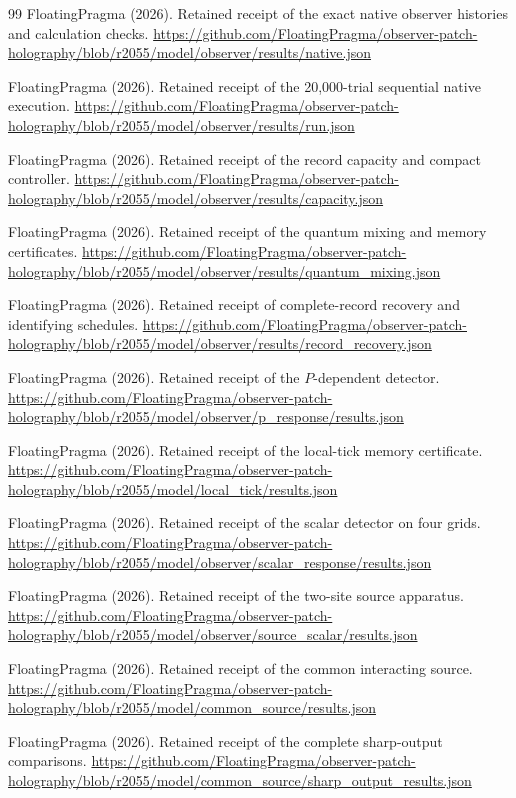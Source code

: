 \documentclass[11pt]{article}
\theoremstyle{definition}
\theoremstyle{remark}
\theoremstyle{plain}
\begin{document}
{\begin{thebibliography}{99}
FloatingPragma (2026). Retained receipt of the exact native observer histories
and calculation checks.
\url{https://github.com/FloatingPragma/observer-patch-holography/blob/r2055/model/observer/results/native.json}

FloatingPragma (2026). Retained receipt of the 20,000-trial sequential native
execution.
\url{https://github.com/FloatingPragma/observer-patch-holography/blob/r2055/model/observer/results/run.json}

FloatingPragma (2026). Retained receipt of the record capacity and compact
controller.
\url{https://github.com/FloatingPragma/observer-patch-holography/blob/r2055/model/observer/results/capacity.json}

FloatingPragma (2026). Retained receipt of the quantum mixing and memory
certificates.
\url{https://github.com/FloatingPragma/observer-patch-holography/blob/r2055/model/observer/results/quantum_mixing.json}

FloatingPragma (2026). Retained receipt of complete-record recovery and
identifying schedules.
\url{https://github.com/FloatingPragma/observer-patch-holography/blob/r2055/model/observer/results/record_recovery.json}

FloatingPragma (2026). Retained receipt of the $P$-dependent detector.
\url{https://github.com/FloatingPragma/observer-patch-holography/blob/r2055/model/observer/p_response/results.json}

FloatingPragma (2026). Retained receipt of the local-tick memory certificate.
\url{https://github.com/FloatingPragma/observer-patch-holography/blob/r2055/model/local_tick/results.json}

FloatingPragma (2026). Retained receipt of the scalar detector on four grids.
\url{https://github.com/FloatingPragma/observer-patch-holography/blob/r2055/model/observer/scalar_response/results.json}

FloatingPragma (2026). Retained receipt of the two-site source apparatus.
\url{https://github.com/FloatingPragma/observer-patch-holography/blob/r2055/model/observer/source_scalar/results.json}

FloatingPragma (2026). Retained receipt of the common interacting source.
\url{https://github.com/FloatingPragma/observer-patch-holography/blob/r2055/model/common_source/results.json}

FloatingPragma (2026). Retained receipt of the complete sharp-output
comparisons.
\url{https://github.com/FloatingPragma/observer-patch-holography/blob/r2055/model/common_source/sharp_output_results.json}


\end{thebibliography}}
\end{document}
